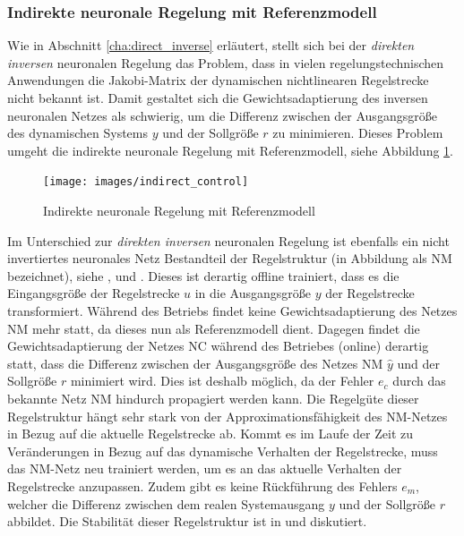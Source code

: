 \subsubsection{Indirekte neuronale Regelung mit Referenzmodell}

Wie in Abschnitt \ref{cha:direct_inverse} erläutert, stellt sich bei der \textit{direkten inversen} neuronalen Regelung das Problem, dass in vielen regelungstechnischen Anwendungen die Jakobi-Matrix der dynamischen nichtlinearen Regelstrecke nicht bekannt ist. Damit gestaltet sich die Gewichtsadaptierung des inversen neuronalen Netzes als schwierig, um die Differenz zwischen der Ausgangsgröße des dynamischen Systems $y$ und der Sollgröße $r$ zu minimieren. Dieses Problem umgeht die indirekte neuronale Regelung mit Referenzmodell, siehe Abbildung \ref{fig:indirect_control}.


\begin{figure} [h]
	\centering
	\texttt{[image: images/indirect\_control]}
	\caption{Indirekte neuronale Regelung mit Referenzmodell \cite{Sklyarenko.2002}}
	\label{fig:indirect_control}
\end{figure}

Im Unterschied zur \textit{direkten inversen} neuronalen Regelung ist ebenfalls ein nicht invertiertes neuronales Netz Bestandteil der Regelstruktur (in Abbildung als NM bezeichnet), siehe \cite{Nguyen.1990}, \cite{BenNasr.2014} und \cite{HUSSAIN.1999}. Dieses ist derartig offline trainiert, dass es die Eingangsgröße der Regelstrecke $u$ in die  Ausgangsgröße $y$ der Regelstrecke transformiert. Während des Betriebs findet keine Gewichtsadaptierung des Netzes NM mehr statt, da dieses nun als Referenzmodell dient. Dagegen findet die Gewichtsadaptierung der Netzes NC während des Betriebes (online) derartig statt, dass die Differenz zwischen der Ausgangsgröße des Netzes NM $\hat{y}$ und der Sollgröße $r$ minimiert wird. Dies ist deshalb möglich, da der Fehler $e_c$ durch das bekannte Netz NM hindurch propagiert werden kann. Die Regelgüte dieser Regelstruktur hängt sehr stark von der Approximationsfähigkeit des NM-Netzes in Bezug auf die aktuelle Regelstrecke ab. Kommt es im Laufe der Zeit zu Veränderungen in Bezug auf das dynamische Verhalten der Regelstrecke, muss das NM-Netz neu trainiert werden, um es an das aktuelle Verhalten der Regelstrecke anzupassen.  Zudem gibt es keine Rückführung des Fehlers $e_m$, welcher die Differenz zwischen dem realen Systemausgang $y$ und der Sollgröße $r$ abbildet. Die Stabilität dieser Regelstruktur ist in \cite{VijayaKumar.2009} und \cite{Ruan.2007} diskutiert.
 



